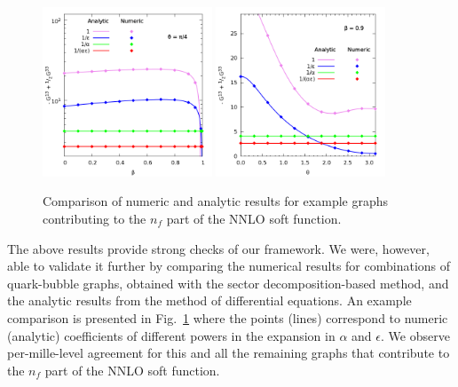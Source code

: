 \documentclass{PoS}
\begin{document}
\begin{figure}[t]
 \begin{center}
 \includegraphics[width=0.45\textwidth]{../../vp-terms/plots/bubble-beta13.png}
 \hfill
 \includegraphics[width=0.45\textwidth]{../../vp-terms/plots/bubble-theta13.png}
 \end{center}
 \caption{
 Comparison of numeric and analytic results for example graphs contributing to
 the $n_f$ part of the NNLO soft function.
 }
 \label{fig:compG13}
\end{figure}


The above results provide strong checks of our framework. We were, however, able
to validate it further by comparing the numerical results for combinations of
quark-bubble graphs, obtained with the sector decomposition-based method, and
the analytic results from the method of differential equations. An example
comparison is presented in Fig.~\ref{fig:compG13} where the points (lines)
correspond to numeric (analytic) coefficients of different powers in the
expansion in $\alpha$ and $\epsilon$. We observe per-mille-level agreement for
this and all the remaining graphs that contribute to the $n_f$ part of the NNLO
soft function.
\end{document}

